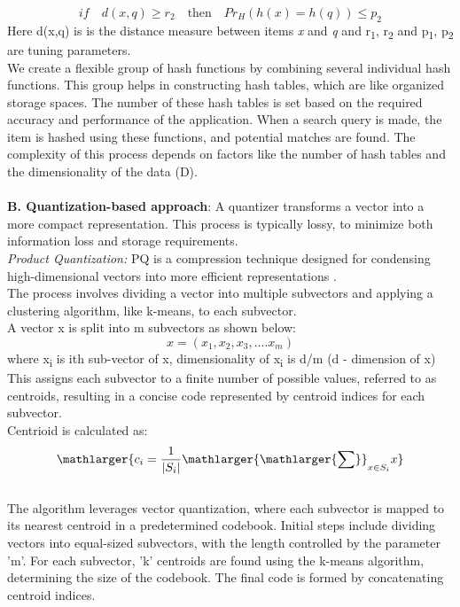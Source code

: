\documentclass[conference]{IEEEtran}
\begin{document}
\[if \quad d(x,q) \geq r_2 \quad \textrm{then} \quad Pr_H(h(x) = h(q)) \leq p_2\]
Here d(x,q) is is the distance measure between items \textit{x} and \textit{q} and r\textsubscript{1}, r\textsubscript{2} and p\textsubscript{1}, p\textsubscript{2} are tuning parameters.
\\
We create a flexible group of hash functions by combining several individual hash functions. 
This group helps in constructing hash tables, which are like organized storage spaces. The number of these hash tables is set based on the required accuracy and performance of the application. When a search query is made, the item is hashed using these functions, and potential matches are found. The complexity of this process depends on factors like the number of hash tables and the dimensionality of the data (D). 
\\
\\
\textbf{B. Quantization-based approach}: A quantizer transforms a vector into a more compact representation. This process is typically lossy, to minimize both information loss and storage requirements.
\\
\textit{Product Quantization:} PQ is a compression technique designed for condensing high-dimensional vectors into more efficient representations \cite{ref1}. 
\\
The process involves dividing a vector into multiple subvectors and applying a clustering algorithm, like k-means, to each subvector. 
\\
A vector x is split into m subvectors as shown below:
\[x = (x_1, x_2, x_3, .... x_m) \]
where x\textsubscript{i} is ith sub-vector of x, dimensionality of x\textsubscript{i} is d/m (d - dimension of x)
\\This assigns each subvector to a finite number of possible values, referred to as centroids, resulting in a concise code represented by centroid indices for each subvector. 
\\ Centrioid is calculated as:
\begin{equation}
  \mathlarger {c_i = \frac{1}{|S_i|} \mathlarger{\mathlarger{\sum}}_{x \in S_i} x}
\end{equation}{}
\\The algorithm leverages vector quantization, where each subvector is mapped to its nearest centroid in a predetermined codebook. Initial steps include dividing vectors into equal-sized subvectors, with the length controlled by the parameter 'm'. For each subvector, 'k' centroids are found using the k-means algorithm, determining the size of the codebook. The final code is formed by concatenating centroid indices.
\end{document}
